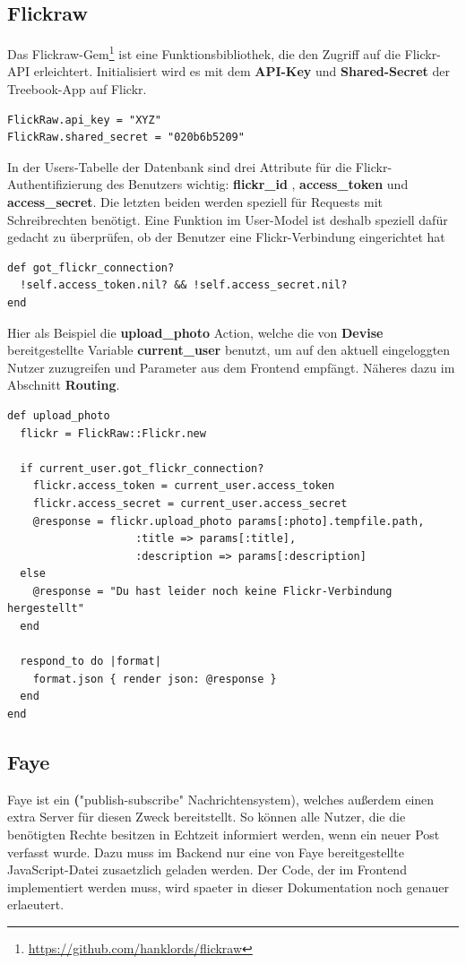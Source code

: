\documentclass[10pt,a4paper]{book}
\begin{document}
\subsection{Flickraw}
Das Flickraw-Gem\footnote{\href{https://github.com/hanklords/flickraw}{https://github.com/hanklords/flickraw}} ist eine Funktionsbibliothek, 
die den Zugriff auf die Flickr-API erleichtert. Initialisiert wird es mit dem \textbf{API-Key} und \textbf{Shared-Secret} der Treebook-App auf Flickr.
\begin{lstlisting}
FlickRaw.api_key = "XYZ"
FlickRaw.shared_secret = "020b6b5209"
\end{lstlisting}
In der Users-Tabelle der Datenbank sind drei Attribute für die Flickr-Authentifizierung des Benutzers wichtig: \textbf{flickr\_id} , 
\textbf{access\_token} und \textbf{access\_secret}. Die letzten beiden werden speziell für Requests mit Schreibrechten benötigt. Eine Funktion im User-Model ist deshalb speziell dafür gedacht zu überprüfen, ob der Benutzer eine Flickr-Verbindung eingerichtet hat
\begin{lstlisting}
def got_flickr_connection?
  !self.access_token.nil? && !self.access_secret.nil?
end
\end{lstlisting}
Hier als Beispiel die \textbf{upload\_photo} Action, welche die von \textbf{Devise} bereitgestellte Variable \textbf{current\_user} benutzt,
um auf den aktuell eingeloggten Nutzer zuzugreifen und Parameter aus dem Frontend empfängt. Näheres dazu im Abschnitt \textbf{Routing}.
\begin{lstlisting}
def upload_photo
  flickr = FlickRaw::Flickr.new

  if current_user.got_flickr_connection?
    flickr.access_token = current_user.access_token
    flickr.access_secret = current_user.access_secret
    @response = flickr.upload_photo params[:photo].tempfile.path, 
    				:title => params[:title], 
    				:description => params[:description]
  else
    @response = "Du hast leider noch keine Flickr-Verbindung hergestellt"
  end

  respond_to do |format|
    format.json { render json: @response }
  end
end
\end{lstlisting}
\subsection{Faye}
Faye ist ein \textbf("publish-subscribe" Nachrichtensystem), welches außerdem einen extra Server für diesen Zweck bereitstellt. So können alle Nutzer, die die benötigten Rechte besitzen in Echtzeit informiert werden, wenn ein neuer Post verfasst wurde. Dazu muss im Backend nur eine von Faye bereitgestellte JavaScript-Datei zusaetzlich geladen werden. Der Code, der im Frontend implementiert werden muss, wird spaeter in dieser Dokumentation noch genauer erlaeutert.
\end{document}
